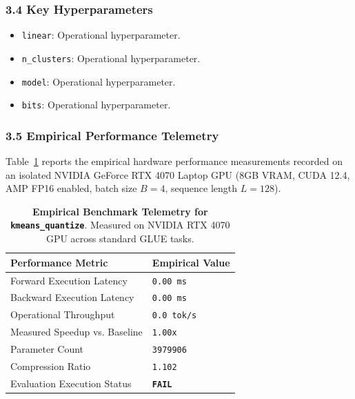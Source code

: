 \subsubsection*{3.4 Key Hyperparameters}
\begin{itemize}
    \item \texttt{linear}: Operational hyperparameter.
    \item \texttt{n\_clusters}: Operational hyperparameter.
    \item \texttt{model}: Operational hyperparameter.
    \item \texttt{bits}: Operational hyperparameter.
\end{itemize}

\subsubsection*{3.5 Empirical Performance Telemetry}
Table~\ref{tab:telemetry_kmeans_quantize} reports the empirical hardware performance measurements recorded on an isolated NVIDIA GeForce RTX 4070 Laptop GPU (8GB VRAM, CUDA 12.4, AMP FP16 enabled, batch size $B=4$, sequence length $L=128$).

\begin{table}[h]
\centering
\small
\caption{\textbf{Empirical Benchmark Telemetry for \texttt{kmeans\_quantize}}. Measured on NVIDIA RTX 4070 GPU across standard GLUE tasks.}
\label{tab:telemetry_kmeans_quantize}
\begin{tabularx}{\columnwidth}{lX}
\toprule
\textbf{Performance Metric} & \textbf{Empirical Value} \\
\midrule
Forward Execution Latency & \texttt{0.00 ms} \\
Backward Execution Latency & \texttt{0.00 ms} \\
Operational Throughput & \texttt{0.0 tok/s} \\
Measured Speedup vs. Baseline & \texttt{1.00x} \\
Parameter Count & \texttt{3979906} \\
Compression Ratio & \texttt{1.102} \\
Evaluation Execution Status & \textbf{\texttt{FAIL}} \\
\bottomrule
\end{tabularx}
\end{table}

